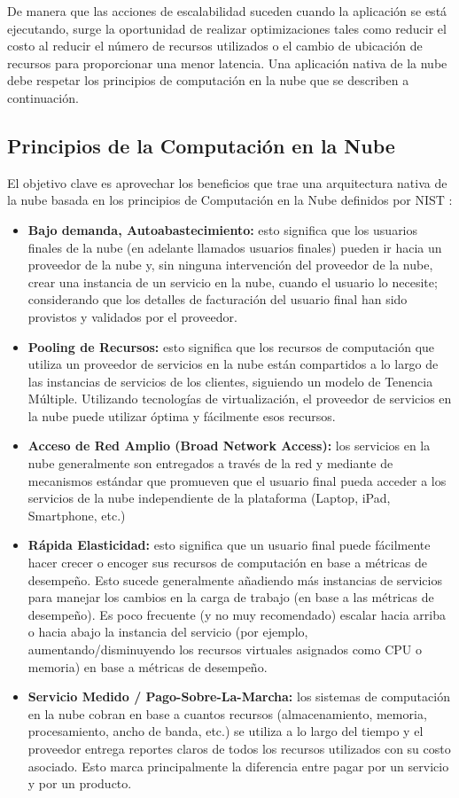     De manera que las acciones de escalabilidad suceden cuando la aplicación se está ejecutando, surge la oportunidad de realizar optimizaciones tales como reducir el costo al reducir el número de recursos utilizados o el cambio de ubicación de recursos para proporcionar una menor latencia. Una aplicación nativa de la nube debe respetar los principios de computación en la nube que se describen a continuación.
	
        \subsection{Principios de la Computación en la Nube}
        El objetivo clave es aprovechar los beneficios que trae una arquitectura nativa de la nube basada en los principios de Computación en la Nube definidos por NIST \cite{Mell2011-wz}:
        \begin{itemize}
            \item \textbf{Bajo demanda, Autoabastecimiento:} esto significa que los usuarios finales de la nube (en adelante llamados usuarios finales) pueden ir hacia un proveedor de la nube y, sin ninguna intervención del proveedor de la nube, crear una instancia de un servicio en la nube,  cuando el usuario lo necesite; considerando que los detalles de facturación del usuario final han sido provistos y validados por el proveedor.
            \item \textbf{Pooling de Recursos:} esto significa que los recursos de computación que utiliza un proveedor de servicios en la nube están compartidos a lo largo de las instancias de servicios de los clientes, siguiendo un modelo de Tenencia Múltiple. Utilizando tecnologías de virtualización, el proveedor de servicios en la nube puede utilizar óptima y fácilmente esos recursos. 
            \item \textbf{Acceso de Red Amplio (Broad Network Access):} los servicios en la nube generalmente son entregados a través de la red y mediante de mecanismos estándar que promueven que el usuario final pueda acceder a los servicios de la nube independiente de la plataforma (Laptop, iPad, Smartphone, etc.)
            \item \textbf{Rápida Elasticidad:} esto significa que un usuario final puede fácilmente hacer crecer o encoger sus recursos de computación en base a métricas de desempeño. Esto sucede generalmente añadiendo más instancias de servicios para manejar los cambios en la carga de trabajo (en base a las métricas de desempeño). Es poco frecuente (y no muy recomendado) escalar hacia arriba o hacia abajo la instancia del servicio (por ejemplo, aumentando/disminuyendo los recursos virtuales asignados como CPU o memoria) en base a métricas de desempeño.
            \item \textbf{Servicio Medido / Pago-Sobre-La-Marcha:}  los sistemas de computación en la nube cobran en base a cuantos recursos (almacenamiento, memoria, procesamiento, ancho de banda, etc.) se utiliza a lo largo del tiempo y el proveedor entrega reportes claros de todos los recursos utilizados con su costo asociado. Esto marca principalmente la diferencia entre pagar por un servicio y por un producto.
        \end{itemize}
        

